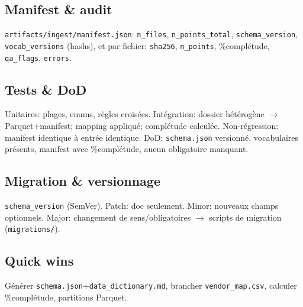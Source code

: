 \subsection{Manifest \& audit}
\texttt{artifacts/ingest/manifest.json}: \texttt{n\_files}, \texttt{n\_points\_total}, \texttt{schema\_version}, \texttt{vocab\_versions} (hashs), et par fichier: \texttt{sha256}, \texttt{n\_points}, \%complétude, \texttt{qa\_flags}, \texttt{errors}.

\subsection{Tests \& DoD}
Unitaires: plages, enums, règles croisées. Intégration: dossier hétérogène $\rightarrow$ Parquet+manifest; mapping appliqué; complétude calculée. Non-régression: manifest identique à entrée identique. DoD: \texttt{schema.json} versionné, vocabulaires présents, manifest avec \%complétude, aucun obligatoire manquant.

\subsection{Migration \& versionnage}
\texttt{schema\_version} (SemVer). Patch: doc seulement. Minor: nouveaux champs optionnels. Major: changement de sens/obligatoires $\rightarrow$ scripts de migration (\texttt{migrations/}).

\subsection{Quick wins}
Générer \texttt{schema.json}+\texttt{data\_dictionary.md}, brancher \texttt{vendor\_map.csv}, calculer \%complétude, partitions Parquet.
